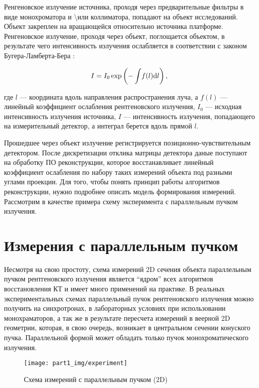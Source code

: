 Ренгеновское излучение источника, проходя через предварительные фильтры в виде монохроматора и \textbackslash или коллиматора, попадают на объект исследований.
Объект закреплен на вращающейся относительно источника платформе.
Ренгеновское излучение, проходя через объект, поглощается объектом, в результате чего интенсивность излучения ослабляется в соответствии с законом Бугера-Ламберта-Бера \cite{sivukhin_blb}:

\begin{equation}
\notag
I = I_0 \exp\left( {-\int \! f(l) \mathrm d l }\right),
\end{equation}

где $l$ ---  координата вдоль направления распространения луча, а $f(l)$ --- линейный коэффициент ослабления рентгеновского излучения, $I_0$ --- исходная интенсивность излучения источника, $I$ --- интенсивность излучения, попадающего на измерительный детектор, а интеграл берется вдоль прямой $l$.

Прошедшее через объект излучение регистрируется позиционно-чувствительным детектором.
После дискретизации отклика матрицы детектора даные поступают на обработку ПО реконструкции, которое восстанавливает линейный коэффициент ослабления по набору таких измерений объекта под разными углами проекции.
Для того, чтобы понять принцип работы алгоритмов реконструкции, нужно подробнее описать модель формирования измерений.
Рассмотрим в качестве примера схему эксперимента с параллельным пучком излучения.

\section{Измерения с параллельным пучком}
Несмотря на свою простоту, схема измерений 2D сечения объекта параллельным пучком рентгеновского излучения является ``ядром'' всех алгоритмов восстановления КТ и имеет много применений на практике.
В реальных экспериментальных схемах параллельный пучок рентгеновского излучения можно получить на синхротронах, в лабораторных условиях при использовании монохраматоров, а так же в результате пересчета измерений в веерной 2D геометрии, которая, в свою очередь, возникает в центральном сечении конуского пучка.
Параллельной формой может обладать только пучок монохроматического излучения. 

\begin{figure}[h!]
  \centering
  \texttt{[image: part1\_img/experiment]}
  \caption{Схема измерений с параллельным пучком (2D)}
  \label{fig:experiment}
\end{figure}

